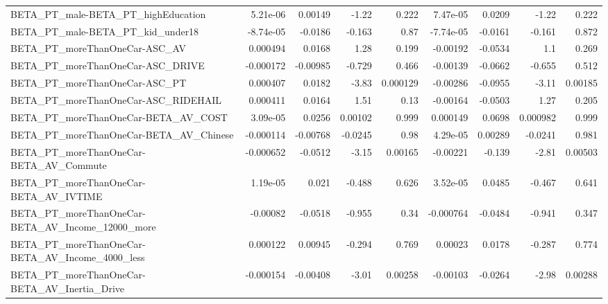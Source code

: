 \begin{tabular}{lrrrrrrrr}
BETA\_PT\_male-BETA\_PT\_highEducation                 &    5.21e-06 &      0.00149 &    -1.22 &    0.222 &   7.47e-05 &      0.0209 &        -1.22 &         0.222 \\
BETA\_PT\_male-BETA\_PT\_kid\_under18                   &   -8.74e-05 &      -0.0186 &   -0.163 &     0.87 &  -7.74e-05 &     -0.0161 &       -0.161 &         0.872 \\
BETA\_PT\_moreThanOneCar-ASC\_AV                      &    0.000494 &       0.0168 &     1.28 &    0.199 &   -0.00192 &     -0.0534 &          1.1 &         0.269 \\
BETA\_PT\_moreThanOneCar-ASC\_DRIVE                   &   -0.000172 &     -0.00985 &   -0.729 &    0.466 &   -0.00139 &     -0.0662 &       -0.655 &         0.512 \\
BETA\_PT\_moreThanOneCar-ASC\_PT                      &    0.000407 &       0.0182 &    -3.83 & 0.000129 &   -0.00286 &     -0.0955 &        -3.11 &       0.00185 \\
BETA\_PT\_moreThanOneCar-ASC\_RIDEHAIL                &    0.000411 &       0.0164 &     1.51 &     0.13 &   -0.00164 &     -0.0503 &         1.27 &         0.205 \\
BETA\_PT\_moreThanOneCar-BETA\_AV\_COST                &    3.09e-05 &       0.0256 &  0.00102 &    0.999 &   0.000149 &      0.0698 &     0.000982 &         0.999 \\
BETA\_PT\_moreThanOneCar-BETA\_AV\_Chinese             &   -0.000114 &     -0.00768 &  -0.0245 &     0.98 &   4.29e-05 &     0.00289 &      -0.0241 &         0.981 \\
BETA\_PT\_moreThanOneCar-BETA\_AV\_Commute             &   -0.000652 &      -0.0512 &    -3.15 &  0.00165 &   -0.00221 &      -0.139 &        -2.81 &       0.00503 \\
BETA\_PT\_moreThanOneCar-BETA\_AV\_IVTIME              &    1.19e-05 &        0.021 &   -0.488 &    0.626 &   3.52e-05 &      0.0485 &       -0.467 &         0.641 \\
BETA\_PT\_moreThanOneCar-BETA\_AV\_Income\_12000\_more   &    -0.00082 &      -0.0518 &   -0.955 &     0.34 &  -0.000764 &     -0.0484 &       -0.941 &         0.347 \\
BETA\_PT\_moreThanOneCar-BETA\_AV\_Income\_4000\_less    &    0.000122 &      0.00945 &   -0.294 &    0.769 &    0.00023 &      0.0178 &       -0.287 &         0.774 \\
BETA\_PT\_moreThanOneCar-BETA\_AV\_Inertia\_Drive       &   -0.000154 &     -0.00408 &    -3.01 &  0.00258 &   -0.00103 &     -0.0264 &        -2.98 &       0.00288 \\

\end{tabular}
